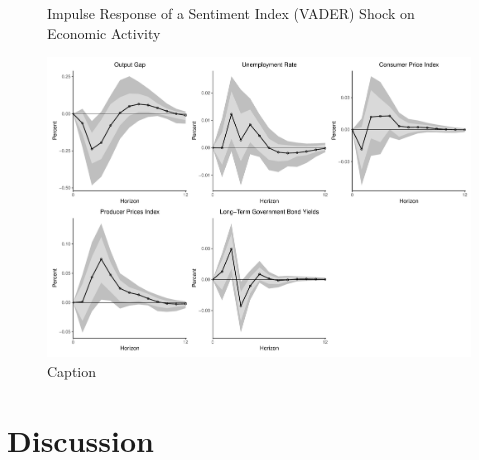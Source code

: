 \begin{figure}
    \centering
    \caption{Impulse Response of a Sentiment Index (VADER) Shock on Economic Activity}
    \includegraphics[width=\textwidth]{images/irf_vader.pdf}
    \caption{Caption}
    \label{fig:my_label}
\end{figure}

\section{Discussion}

